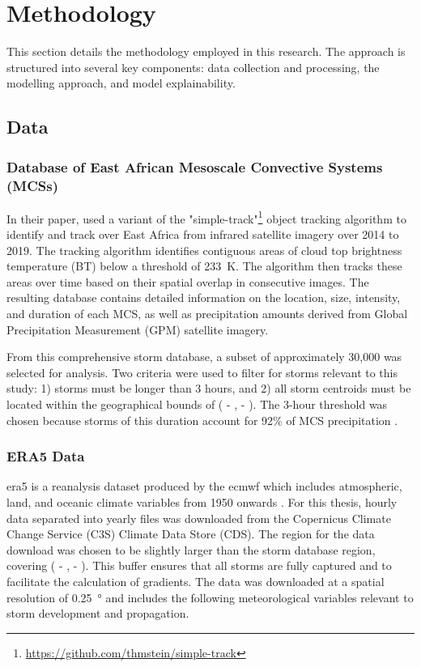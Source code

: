 \chapter{Methodology}
\label{ch:method}

This section details the methodology employed in this research. The approach is structured into several key components: data collection and processing, the modelling approach, and model explainability.

\section{Data}

\subsection{Database of East African Mesoscale Convective Systems (MCSs)}

In their paper, \cite{Hill2023} used a variant of the "simple-track"\footnote{\href{https://github.com/thmstein/simple-track}{https://github.com/thmstein/simple-track}} object tracking algorithm to identify and track  over East Africa from infrared satellite imagery over 2014 to 2019. The tracking algorithm identifies contiguous areas of cloud top brightness temperature (BT) below a threshold of \SI{233}{\kelvin}. The algorithm then tracks these areas over time based on their spatial overlap in consecutive images. The resulting database contains detailed information on the location, size, intensity, and duration of each MCS, as well as precipitation amounts derived from Global Precipitation Measurement (GPM) satellite imagery.

From this comprehensive storm database, a subset of approximately 30,000 was selected for analysis. Two criteria were used to filter for storms relevant to this study: 1) storms must be longer than 3 hours, and 2) all storm centroids must be located within the geographical bounds of ( - ,  - ). The 3-hour threshold was chosen because storms of this duration account for 92\% of MCS precipitation \citep{Hill2023}.

\subsection{ERA5 Data}

\acrfull{era5} is a reanalysis dataset produced by the \acrfull{ecmwf} which includes atmospheric, land, and oceanic climate variables from 1950 onwards \citep{Hersbach2020}. For this thesis, hourly data separated into yearly files was downloaded from the Copernicus Climate Change Service (C3S) Climate Data Store (CDS). The region for the data download was chosen to be slightly larger than the storm database region, covering ( - ,  - ). This buffer ensures that all storms are fully captured and to facilitate the calculation of gradients. The data was downloaded at a spatial resolution of \SI{0.25}{\degree} and includes the following meteorological variables relevant to storm development and propagation.

